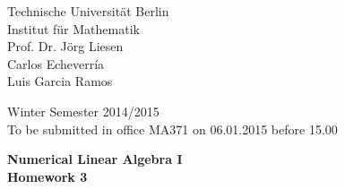 \documentclass[10pt]{report}
\begin{document}
\begin{minipage}[t]{0.58\textwidth}
Technische Universit\"at Berlin\\
Institut f\"ur Mathematik\\
Prof. Dr. J\"org Liesen\\
Carlos Echeverr\'ia\\
Luis Garcia Ramos
\end{minipage}
\hfill
\begin{minipage}[t]{0.48\textwidth}
\begin{flushright}
Winter Semester 2014/2015\\
To be submitted in office MA371 on 06.01.2015 before 15.00
\end{flushright}
\end{minipage}
\begin{center}
\textbf{{Numerical Linear Algebra I}}\\
\textbf{Homework 3}
\end{center}
\thispagestyle{empty}
\vspace{0cm}
\end{document}

